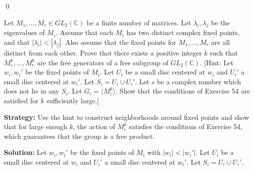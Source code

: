 \qed
\begin{problembox}
Let $M_1, \ldots, M_r \in GL_2(\mathbb{C})$ be a finite number of matrices. Let $\lambda_i, \lambda_j$ be the eigenvalues of $M_i$. Assume that each $M_i$ has two distinct complex fixed points, and that $|\lambda_i| < |\lambda_j|$. Also assume that the fixed points for $M_1, \ldots, M_r$ are all distinct from each other. Prove that there exists a positive integer $k$ such that $M_i^k, \ldots, M_r^k$ are the free generators of a free subgroup of $GL_2(\mathbb{C})$. [Hint: Let $w_i, w_i'$ be the fixed points of $M_i$. Let $U_i$ be a small disc centered at $w_i$ and $U_i'$ a small disc centered at $w_i'$. Let $S_i = U_i \cup U_i'$. Let $s$ be a complex number which does not lie in any $S_i$. Let $G_i = \langle M_i^k \rangle$. Show that the conditions of Exercise 54 are satisfied for $k$ sufficiently large.]

\noindent\textbf{Strategy:} Use the hint to construct neighborhoods around fixed points and show that for large enough $k$, the action of $M_i^k$ satisfies the conditions of Exercise 54, which guarantees that the group is a free product.

\noindent\textbf{Solution:} Let $w_i, w_i'$ be the fixed points of $M_i$ with $|w_i| < |w_i'|$. Let $U_i$ be a small disc centered at $w_i$ and $U_i'$ a small disc centered at $w_i'$. Let $S_i = U_i \cup U_i'$.

\end{problembox}


